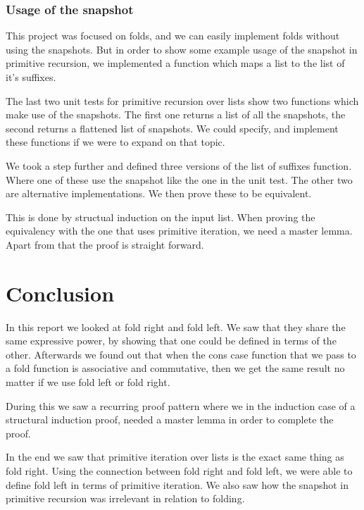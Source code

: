 \documentclass[a4paper]{article}
\begin{document}
\subsubsection{Usage of the snapshot}
This project was focused on folds, and we can easily implement folds without
using the snapshots. But in order to show some example usage of the snapshot in
primitive recursion, we implemented a function which maps a list to the list of
it's suffixes.

The last two unit tests for primitive recursion over lists show two functions
which make use of the snapshots. The first one returns a list of all the
snapshots, the second returns a flattened list of snapshots. We could specify,
and implement these functions if we were to expand on that topic.

We took a step further and defined three versions of the list of suffixes
function. Where one of these use the snapshot like the one in the unit test. The
other two are alternative implementations. We then prove these to be equivalent.

This is done by structual induction on the input list. When proving the
equivalency with the one that uses primitive iteration, we need a master lemma.
Apart from that the proof is straight forward.

\section{Conclusion}
In this report we looked at fold right and fold left. We saw that they share the
same expressive power, by showing that one could be defined in terms of the 
other. Afterwards we found out that when the cons case function that we pass
to a fold function is associative and commutative, then we get the same result
no matter if we use fold left or fold right. 

During this we saw a recurring proof pattern where we in the induction case of a
structural induction proof, needed a master lemma in order to complete the
proof.

In the end we saw that primitive iteration over lists is the exact same
thing as fold right. Using the connection between fold right and fold left, we
were able to define fold left in terms of primitive iteration. We also saw how
the snapshot in primitive recursion was irrelevant in relation to folding.

\printbibliography[heading=bibnumbered]{}
\end{document}
